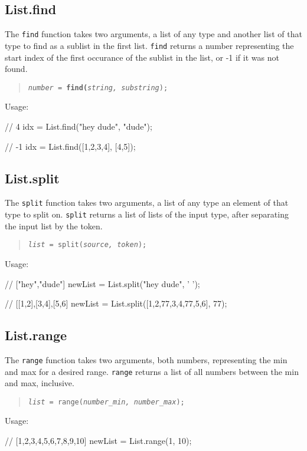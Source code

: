 \documentclass[oneside]{book}
\begin{document}
\subsection{List.find}
The \texttt{find} function takes two arguments, a list of any type and another list of that type to find as a sublist in the first list. \texttt{find} returns a number representing the start index of the first occurance of the sublist in the list, or -1 if it was not found.
\begin{quote}
\texttt{\emph{number = }}\texttt{\textbf{find(}}\texttt{\emph{string,
substring}}\texttt{);}
\end{quote}
Usage:
\begin{mdframed}
[hidealllines=true,backgroundcolor=gray!10,skipbelow=.5em,skipabove=.5em]
\begin{code}
// 4
idx = List.find("hey dude", "dude");

// -1
idx = List.find([1,2,3,4], [4,5]);
\end{code}
\end{mdframed}

\subsection{List.split}
The \texttt{split} function takes two arguments, a list of any type an element of that type to split on. \texttt{split} returns a list of lists of the input type, after separating the input list by the token.
\begin{quote}
\texttt{\emph{list = }}\texttt{split(}\texttt{\emph{source, token}}\texttt{);}
\end{quote}
Usage:
\begin{mdframed}
[hidealllines=true,backgroundcolor=gray!10,skipbelow=.5em,skipabove=.5em]
\begin{code}
// ["hey","dude"]
newList = List.split("hey dude", ' ');

// [[1,2],[3,4],[5,6]
newList = List.split([1,2,77,3,4,77,5,6], 77);
\end{code}
\end{mdframed}

\subsection{List.range}
The \texttt{range} function takes two arguments, both numbers, representing the min and max for a desired range. \texttt{range} returns a list of all numbers between the min and max, inclusive.
\begin{quote}
\texttt{\emph{list = }}\texttt{range(}\texttt{\emph{number\_min, number\_max}}\texttt{);}
\end{quote}
Usage:
\begin{mdframed}
[hidealllines=true,backgroundcolor=gray!10,skipbelow=.5em,skipabove=.5em]
\begin{code}
// [1,2,3,4,5,6,7,8,9,10]
newList = List.range(1, 10);
\end{code}
\end{mdframed}
\end{document}
